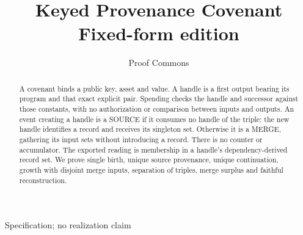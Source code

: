 \documentclass[../main.tex]{subfiles}
\begin{document}
\title{Keyed Provenance Covenant\\Fixed-form edition}
\author{Proof Commons \\ \docversion}
\date{\LineageDate}
\maketitle
\begin{center}
Specification; no realization claim
\end{center}

\begin{abstract}
\label{abst:kpcfixed:abstract}
A covenant binds a public key, asset and value. A handle is a first
output bearing its program and that exact explicit pair. Spending checks
the handle and successor against those constants, with no authorization
or comparison between inputs and outputs. An event creating a handle
is a SOURCE if it consumes no handle of the triple: the new handle identifies a record and receives its
singleton set. Otherwise it is a MERGE, gathering its input sets without
introducing a record. There is no counter or accumulator. The exported
reading is membership in a handle's dependency-derived record set.
We prove single birth, unique source provenance, unique continuation,
growth with disjoint merge inputs, separation of triples, merge surplus and faithful
reconstruction.
\end{abstract}
\end{document}
